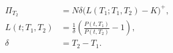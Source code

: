 \documentclass{equation-sheet}
\begin{document}
\begin{equation*}
\begin{aligned}
\Pi_{T_2}
  &= N\delta\bigl(L(T_1;T_1,T_2)-K\bigr)^{+}, \\[0.75em]
L(t;T_1,T_2)
  &= \frac{1}{\delta}
     \left(\frac{P(t,T_1)}{P(t,T_2)}-1\right), \\[0.55em]
\delta &= T_2-T_1.
\end{aligned}
\end{equation*}
\end{document}
